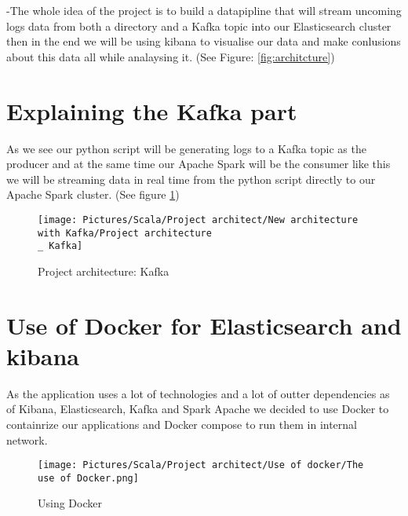 \par
-The whole idea of the project is to build a datapipline that will stream uncoming logs data from both a directory and a Kafka topic into our Elasticsearch cluster then in the end we will be using kibana to visualise our data and make conlusions about this data all while analaysing it. (See Figure:  \ref{fig:architcture})
\begin{spacing}{1.2}

\newpage
\section{Explaining the Kafka part}

\par 
As we see our python script will be generating logs to a Kafka topic as the producer and at the same time our Apache Spark will be the consumer like this we will be streaming data in real time from the python script directly to our Apache Spark cluster. (See figure \ref{fig:Kafka})
\\

\begin{figure}[!htb] 
\begin{center} 
\texttt{[image: Pictures/Scala/Project architect/New architecture with Kafka/Project architecture\\\_ Kafka]} 
\end{center} 
\caption{Project architecture: Kafka} 
\label{fig:Kafka}
\end{figure}  \FloatBarrier



\section{Use of Docker for Elasticsearch and kibana}
\par 
As the application uses a lot of technologies and a lot of outter dependencies as of Kibana, Elasticsearch, Kafka and Spark Apache we decided to use Docker to containrize our applications and Docker compose to run them in internal network.


\begin{figure}[!htb] 
\begin{center} 
\texttt{[image: Pictures/Scala/Project architect/Use of docker/The use of Docker.png]}
\end{center} 
\caption{Using Docker} 
\end{figure}  \FloatBarrier
\\



\end{spacing}
